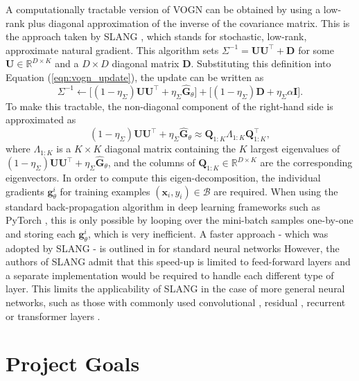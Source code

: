 \documentclass[msc,deptreport.inf]{infthesis} %
\newcommand{\matr}[1]{\mathbf{#1}}
\newcommand{\R}{\mathbb R}
\begin{document}
A computationally tractable version of VOGN can be obtained by using a low-rank plus diagonal approximation of the inverse of the covariance matrix. This is the approach taken by SLANG \cite{mishkin2018}, which stands for stochastic, low-rank, approximate natural gradient. This algorithm sets $\Sigma^{-1} = \matr{U} \matr{U}^\intercal + \matr{D}$ for some $\matr{U} \in \R^{D \times K}$ and a $D \times D$ diagonal matrix $\matr{D}$. Substituting this definition into Equation (\ref{eqn:vogn_update}), the update can be written as
\begin{equation}
	\Sigma^{-1} \leftarrow 
	\big[(1 - \eta_\Sigma) \matr{U} \matr{U}^\intercal + \eta_\Sigma \hat{\matr{G}}_\theta \big] 
	+ \big[(1 - \eta_\Sigma) \matr{D} + \eta_\Sigma \alpha \matr{I}\big].
\end{equation}
To make this tractable, the non-diagonal component of the right-hand side is approximated as
\begin{equation}
	(1 - \eta_\Sigma) \matr{U} \matr{U}^\intercal + \eta_\Sigma \hat{\matr{G}}_\theta 
	\approx \matr{Q}_{1:K} \Lambda_{1:K} \matr{Q}_{1:K}^\intercal,
\end{equation}
where $\Lambda_{1:K}$ is a $K \times K$ diagonal matrix containing the $K$ largest eigenvalues of $(1 - \eta_\Sigma) \matr{U} \matr{U}^\intercal + \eta_\Sigma \hat{\matr{G}}_\theta$, and the columns of $\matr{Q}_{1:K} \in \R^{D \times K}$ are the corresponding eigenvectors. In order to compute this eigen-decomposition, the individual gradients $\matr{g}_\theta^i$ for training examples  $(\matr{x}_i, y_i) \in \mathcal{B}$ are required. When using the standard back-propagation algorithm in deep learning frameworks such as PyTorch \cite{paszke2019}, this is only possible by looping over the mini-batch samples one-by-one and storing each $\matr{g}_\theta^i$, which is very inefficient. A faster approach - which was adopted by SLANG - is outlined in \cite{goodfellow2015} for standard neural networks However, the authors of SLANG admit that this speed-up is limited to feed-forward layers and a separate implementation would be required to handle each different type of layer. This limits the applicability of SLANG in the case of more general neural networks, such as those with commonly used convolutional \cite{krizhevsky09}, residual \cite{he2015}, recurrent \cite{hochreiter1997} or transformer layers \cite{vaswani2017}.  


\section{Project Goals}
\end{document}
